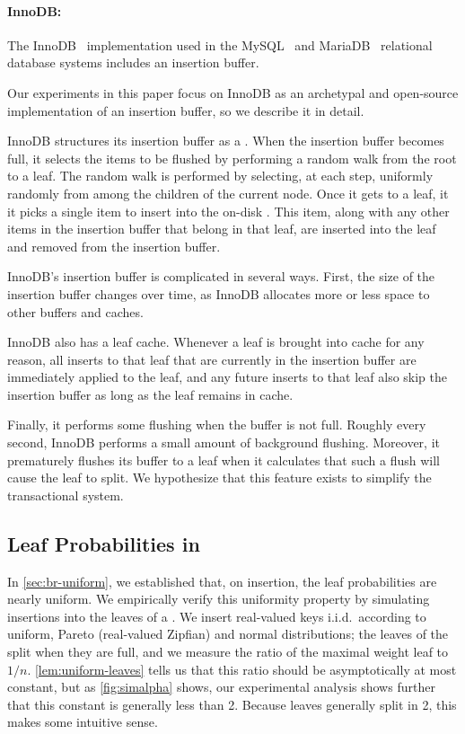 \paragraph{InnoDB:}  The InnoDB~\cite{Oracle17a} \btree{} implementation used
in the MySQL~\cite{Oracle17b} and MariaDB~\cite{Foundation17} relational
database systems includes an insertion buffer.

Our experiments in this paper focus on InnoDB as an archetypal and open-source
implementation of an insertion buffer, so we describe it in detail.

InnoDB structures its insertion buffer as a \btree{}.  When the insertion
buffer becomes full, it selects the items to be flushed by performing a random
walk from the root to a leaf.  The random walk is performed by selecting, at
each step, uniformly randomly from among the children of the current node.
Once it gets to a leaf, it it picks a single item to insert into the on-disk
\btree{}.  This item, along with any other items in the insertion buffer that
belong in that leaf, are inserted into the leaf and removed from the insertion
buffer.

InnoDB's insertion buffer is complicated in several ways.  First, the size of
the insertion buffer changes over time, as InnoDB allocates more or less space
to other buffers and caches.

InnoDB also has a leaf cache.  Whenever a leaf is brought into cache for any
reason, all inserts to that leaf that are currently in the insertion buffer are
immediately applied to the leaf, and any future inserts to that leaf also skip
the insertion buffer as long as the leaf remains in cache.

Finally, it performs some flushing when the buffer is not full. Roughly every
second, InnoDB performs a small amount of background flushing. Moreover, it
prematurely flushes its buffer to a leaf when it calculates that such a flush
will cause the leaf to split. We hypothesize that this feature exists to
simplify the transactional system.

\subsection{Leaf Probabilities in \btrees{}}\label{sec:br-exp-insertion}
In \cref{sec:br-uniform}, we established that, on insertion, the leaf
probabilities are nearly uniform.  We empirically verify this uniformity
property by simulating insertions into the leaves of a \btree{}. We insert
real-valued keys i.i.d.\ according to uniform, Pareto (real-valued Zipfian) and
normal distributions; the leaves of the \btree{} split when they are full, and
we measure the ratio of the maximal weight leaf to $1/n$.
\cref{lem:uniform-leaves} tells us that this ratio should be asymptotically at
most constant, but as \cref{fig:simalpha} shows, our experimental analysis
shows further that this constant is generally less than 2. Because leaves
generally split in 2, this makes some intuitive sense.

